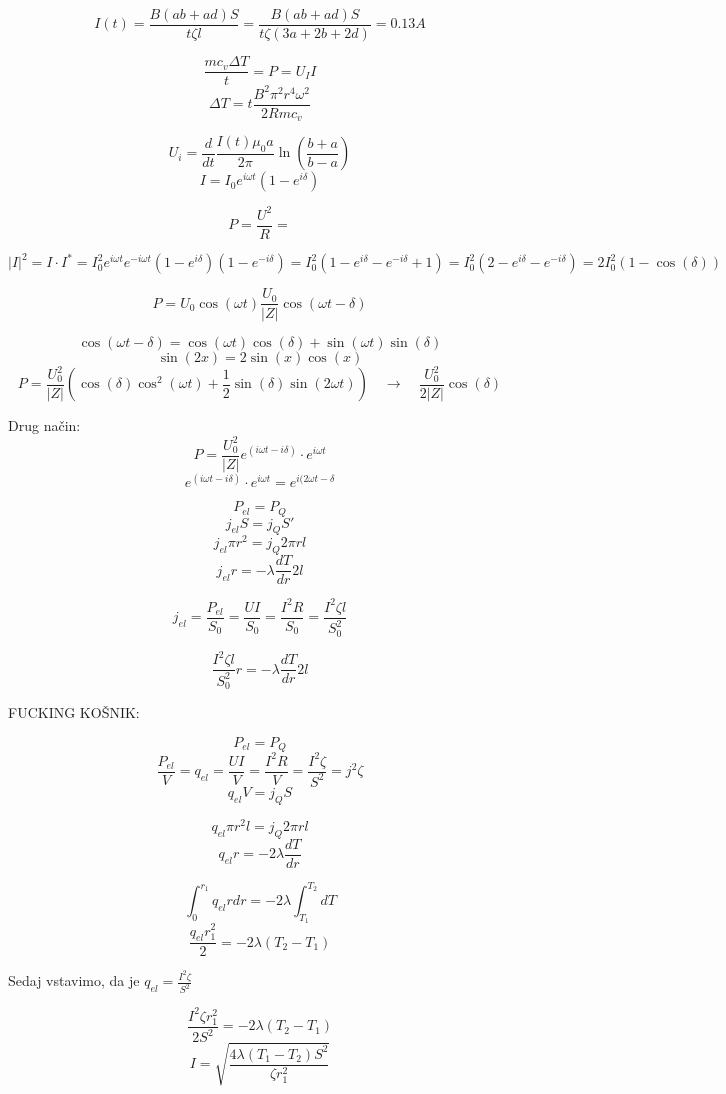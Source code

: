 \documentclass[11pt, a4paper]{article}
\theoremstyle{definition}
\theoremstyle{example}
\theoremstyle{izrek}
\begin{document}
$$I(t)=\frac{B(ab+ad)S}{t \zeta l}=\frac{B(ab+ad)S}{t \zeta (3a+2b+2d)}=0.13 A$$

$$\frac{m c_v \Delta T}{t}=P=U_I I$$
$$\Delta T=t\frac{B^2\pi^2 r^4 \omega^2}{2 R m c_v}$$

\pagebreak
$$U_i=\frac{d}{dt}\frac{I(t)\mu_0 a}{2 \pi}\ln(\frac{b+a}{b-a})$$
$$I=I_0 e^{i\omega t}(1-e^{i\delta})$$

$$P=\frac{U^2}{R}=$$

$$|I|^2=I\cdot I^{*}=I_0^2 e^{i\omega t}e^{-i \omega t}(1-e^{i \delta})(1-e^{-i \delta})=I_0^2 (1-e^{i \delta}-e^{-i \delta}+1)=I_0^2 (2-e^{i \delta}-e^{-i \delta})=2I_0^2(1-\cos(\delta))$$

\pagebreak
$$P=U_0 \cos(\omega t) \frac{U_0}{|Z|}\cos(\omega t -\delta)$$

$$\cos(\omega t -\delta)=\cos(\omega t) \cos(\delta)+\sin(\omega t)\sin(\delta)$$
$$\sin(2x)=2\sin(x)\cos(x)$$
$$P=\frac{U_0^2}{|Z|}(\cos(\delta) \cos^2(\omega t)+\frac{1}{2}\sin(\delta)\sin(2\omega t))\quad \rightarrow \quad\frac{U_0^2}{2|Z|}\cos(\delta)$$

Drug način:
$$P=\frac{U_0^2}{|Z|}e^{(i\omega t-i\delta)}\cdot e^{i\omega t}$$
$$e^{(i\omega t-i\delta)}\cdot e^{i\omega t}=e^{i(2\omega t-\delta}$$

\pagebreak
$$P_{el}=P_{Q}$$
$$j_{el}S=j_Q S'$$
$$j_{el}\pi r^2 =j_Q 2\pi rl$$
$$j_{el} r =-\lambda \frac{dT}{dr} 2 l$$

$$j_{el}=\frac{P_{el}}{S_0}=\frac{UI}{S_0}=\frac{I^2R}{S_0}=\frac{I^2 \zeta l}{ S_0^2 }$$

$$\frac{I^2 \zeta l}{ S_0^2 } r =-\lambda \frac{dT}{dr} 2 l$$
\begin{center}
FUCKING KOŠNIK:

\end{center}
$$P_{el}=P_Q$$
$$\frac{P_{el}}{V}=q_{el}=\frac{UI}{V}=\frac{I^2R}{V}=\frac{I^2\zeta}{S^2}=j^2 \zeta$$
$$q_{el} V=j_Q S$$

$$q_{el} \pi r^2 l=j_Q 2\pi rl $$
$$q_{el} r=-2\lambda \frac{dT}{dr}$$

$$\int_{0}^{r_1} q_{el} r dr=-2\lambda \int_{T_1}^{T_2} dT$$
$$\frac{q_{el}r_1^2}{2}=-2\lambda (T_2-T_1)$$
\begin{center}
Sedaj vstavimo, da je $q_{el}=\frac{I^2\zeta}{S^2}$

\end{center}
$$\frac{I^2\zeta r_1^2}{2S^2}=-2\lambda (T_2-T_1)$$
$$I=\sqrt{\frac{4\lambda(T_1-T_2)S^2}{\zeta r_1^2}}$$
\end{document}
